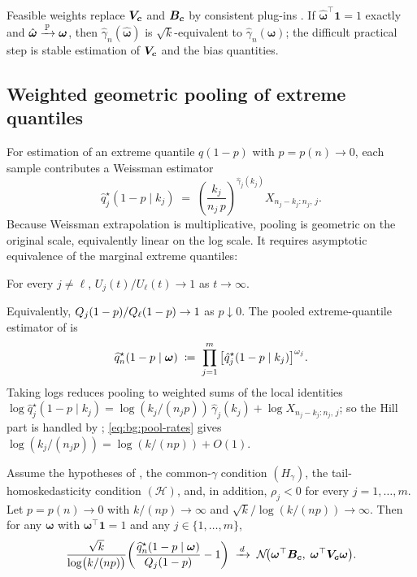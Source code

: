 Feasible weights replace $\bm{V}_{\bm{c}}$ and $\bm{B}_{\bm{c}}$ by consistent plug-ins
\parencite[\S2.2]{DaouiaPadoanStupfler2021}. If
$\hat{\bm\omega}^{\top}\bm 1=1$ exactly and
$\hat{\bm\omega}\xrightarrow{\,\operatorname{\mathbb{P}}\,}\bm\omega$, then
$\hat\gamma_n(\hat{\bm\omega})$ is $\sqrt{k}$-equivalent to
$\hat\gamma_n(\bm\omega)$; the difficult practical step is stable
estimation of $\bm{V}_{\bm{c}}$ and the bias quantities.

\subsection{Weighted geometric pooling of extreme quantiles}

For estimation of an extreme quantile $q(1 - p)$ with $p = p(n) \to
0$, each sample contributes a Weissman estimator
\[
  \hat q_{j}^{\star}(1 - p \mid k_{j})
  \;=\;
  \left(\frac{k_{j}}{n_{j}\, p}\right)^{\!\hat\gamma_{j}(k_{j})}\!
  X_{n_{j} - k_{j} : n_{j},\,j}.
\]
Because Weissman extrapolation is multiplicative, pooling is geometric
on the original scale, equivalently linear on the log scale. It requires
asymptotic equivalence of the marginal extreme quantiles:
\begin{condition}
\label{cond:bg:tail-homoskedasticity}
For every $j \ne \ell$, $U_{j}(t) / U_{\ell}(t) \to 1$ as $t \to
\infty$.
\end{condition}
Equivalently, $Q_j(1-p)/Q_\ell(1-p)\to1$ as $p\downarrow0$.
The pooled extreme-quantile estimator of
\textcite[\S2.3]{DaouiaPadoanStupfler2021} is
\begin{equation}
\label{eq:bg:pooled-weissman}
  \widehat{q}^{\star}_{n}(1 - p \mid \bm\omega)
  \;\coloneqq\;
  \prod_{j = 1}^{m}
    \big[\hat q_{j}^{\star}(1 - p \mid k_{j})\big]^{\omega_{j}}.
\end{equation}
Taking logs reduces pooling to weighted sums of the local identities
$\log \hat q_{j}^{\star}(1 - p \mid k_{j})
  = \log(k_{j}/(n_{j} p))\,\hat\gamma_{j}(k_{j})
    + \log X_{n_{j} - k_{j} : n_{j},\,j}$;
so the Hill part is handled by ;
\eqref{eq:bg:pool-rates} gives
$\log(k_j/(n_jp))=\log(k/(np))+O(1)$.

\begin{theorem}
\label{thm:bg:pool-weissman}
Assume the hypotheses of , the common-$\gamma$
condition $(H_{\gamma})$, the tail-homoskedasticity
condition $(\mathcal H)$, and, in addition, $\rho_j<0$ for every
$j=1,\ldots,m$. Let $p = p(n) \to 0$ with
$k/(np) \to \infty$ and $\sqrt{k}/\log(k/(np)) \to \infty$. Then for
any $\bm\omega$ with $\bm\omega^{\top}\bm 1 = 1$ and any
$j \in \{1, \ldots, m\}$,
\[
  \frac{\sqrt{k}}{\log\!\big(k/(np)\big)}
  \!\left(\frac{\widehat{q}^{\star}_{n}(1 - p \mid \bm\omega)}{Q_{j}(1 - p)}
            - 1\right)
  \;\xrightarrow{\,d\,}\;
  \mathcal N\!\big(\bm\omega^{\top}\bm{B}_{\bm{c}},\;
                    \bm\omega^{\top}\bm{V}_{\bm{c}}\bm\omega\big).
\]
\end{theorem}

